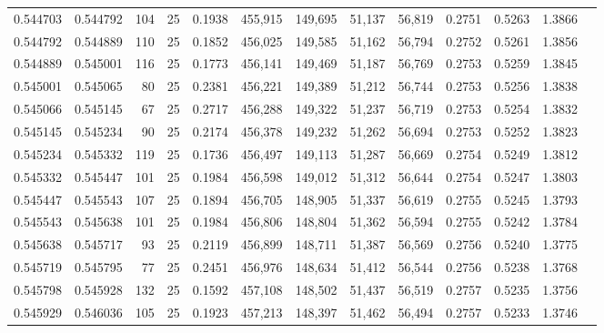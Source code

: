 \begin{tabular}{rrrrrrrrrrrrr}
0.544703 & 0.544792 &   104 &  25 &                                     0.1938 & 455,915 & 149,695 &  51,137 &  56,819 & 0.2751 & 0.5263 & 1.3866 \\
0.544792 & 0.544889 &   110 &  25 &                                     0.1852 & 456,025 & 149,585 &  51,162 &  56,794 & 0.2752 & 0.5261 & 1.3856 \\
0.544889 & 0.545001 &   116 &  25 &                                     0.1773 & 456,141 & 149,469 &  51,187 &  56,769 & 0.2753 & 0.5259 & 1.3845 \\
0.545001 & 0.545065 &    80 &  25 &                                     0.2381 & 456,221 & 149,389 &  51,212 &  56,744 & 0.2753 & 0.5256 & 1.3838 \\
0.545066 & 0.545145 &    67 &  25 &                                     0.2717 & 456,288 & 149,322 &  51,237 &  56,719 & 0.2753 & 0.5254 & 1.3832 \\
0.545145 & 0.545234 &    90 &  25 &                                     0.2174 & 456,378 & 149,232 &  51,262 &  56,694 & 0.2753 & 0.5252 & 1.3823 \\
0.545234 & 0.545332 &   119 &  25 &                                     0.1736 & 456,497 & 149,113 &  51,287 &  56,669 & 0.2754 & 0.5249 & 1.3812 \\
0.545332 & 0.545447 &   101 &  25 &                                     0.1984 & 456,598 & 149,012 &  51,312 &  56,644 & 0.2754 & 0.5247 & 1.3803 \\
0.545447 & 0.545543 &   107 &  25 &                                     0.1894 & 456,705 & 148,905 &  51,337 &  56,619 & 0.2755 & 0.5245 & 1.3793 \\
0.545543 & 0.545638 &   101 &  25 &                                     0.1984 & 456,806 & 148,804 &  51,362 &  56,594 & 0.2755 & 0.5242 & 1.3784 \\
0.545638 & 0.545717 &    93 &  25 &                                     0.2119 & 456,899 & 148,711 &  51,387 &  56,569 & 0.2756 & 0.5240 & 1.3775 \\
0.545719 & 0.545795 &    77 &  25 &                                     0.2451 & 456,976 & 148,634 &  51,412 &  56,544 & 0.2756 & 0.5238 & 1.3768 \\
0.545798 & 0.545928 &   132 &  25 &                                     0.1592 & 457,108 & 148,502 &  51,437 &  56,519 & 0.2757 & 0.5235 & 1.3756 \\
0.545929 & 0.546036 &   105 &  25 &                                     0.1923 & 457,213 & 148,397 &  51,462 &  56,494 & 0.2757 & 0.5233 & 1.3746 \\

\end{tabular}
